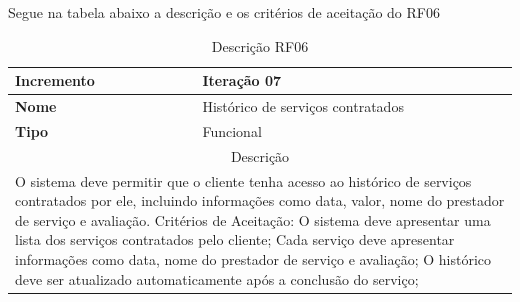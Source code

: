 \clearpage
Segue na tabela abaixo a descrição e os critérios de aceitação do RF06
\begin{table}[htb]
	\centering
	\caption{\label{Formatação do texto.}Descrição RF06}	
	\begin{tabular}{|l|p{11cm}|}
		\hline
		\textbf{Incremento}    & Iteração 07\\ \hline
		\textbf{Nome}    & Histórico de serviços contratados\\ \hline
		\textbf{Tipo}    & Funcional\\ \hline
		\multicolumn{2}{|c|}{Descrição}\\ \hline
		\multicolumn{2}{|p{12cm}|}{
			O sistema deve permitir que o cliente tenha acesso ao histórico de serviços contratados por ele, incluindo informações como data, valor, nome do prestador de serviço e avaliação. \newline
			\newline Critérios de Aceitação: \newline
			O sistema deve apresentar uma lista dos serviços contratados pelo cliente; \newline
            Cada serviço deve apresentar informações como data, nome do prestador de serviço e avaliação; \newline
			\newline O histórico deve ser atualizado automaticamente após a conclusão do serviço;
			} \\ \hline
	\end{tabular}
\end{table}

